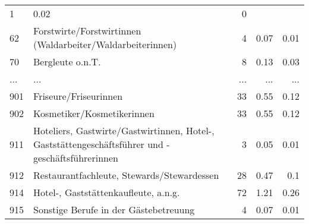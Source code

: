 \begin{longtable}{lXrrr}
          \num{1} &
          \num[round-mode=places,round-precision=2]{0,02} &
          \num[round-mode=places,round-precision=2]{0} \\
        62 & \multicolumn{1}{X}{Forstwirte/Forstwirtinnen (Waldarbeiter/Waldarbeiterinnen)} & %
          \num{4} &
          \num[round-mode=places,round-precision=2]{0,07} &
          \num[round-mode=places,round-precision=2]{0,01} \\
        70 & \multicolumn{1}{X}{Bergleute o.n.T.} & %
          \num{8} &
          \num[round-mode=places,round-precision=2]{0,13} &
          \num[round-mode=places,round-precision=2]{0,03} \\
       ... & ... & ... & ... & ... \\
        901 & \multicolumn{1}{X}{Friseure/Friseurinnen} & %
          \num{33} &
          \num[round-mode=places,round-precision=2]{0,55} &
          \num[round-mode=places,round-precision=2]{0,12} \\

        902 & \multicolumn{1}{X}{Kosmetiker/Kosmetikerinnen} & %
          \num{33} &
          \num[round-mode=places,round-precision=2]{0,55} &
          \num[round-mode=places,round-precision=2]{0,12} \\

        911 & \multicolumn{1}{X}{Hoteliers, Gastwirte/Gastwirtinnen, Hotel-, Gaststättengeschäftsführer und -geschäftsführerinnen} & %
          \num{3} &
          \num[round-mode=places,round-precision=2]{0,05} &
          \num[round-mode=places,round-precision=2]{0,01} \\

        912 & \multicolumn{1}{X}{Restaurantfachleute, Stewards/Stewardessen} & %
          \num{28} &
          \num[round-mode=places,round-precision=2]{0,47} &
          \num[round-mode=places,round-precision=2]{0,1} \\

        914 & \multicolumn{1}{X}{Hotel-, Gaststättenkaufleute, a.n.g.} & %
          \num{72} &
          \num[round-mode=places,round-precision=2]{1,21} &
          \num[round-mode=places,round-precision=2]{0,26} \\

        915 & \multicolumn{1}{X}{Sonstige Berufe in der Gästebetreuung} & %
          \num{4} &
          \num[round-mode=places,round-precision=2]{0,07} &
          \num[round-mode=places,round-precision=2]{0,01} \\


\end{longtable}
